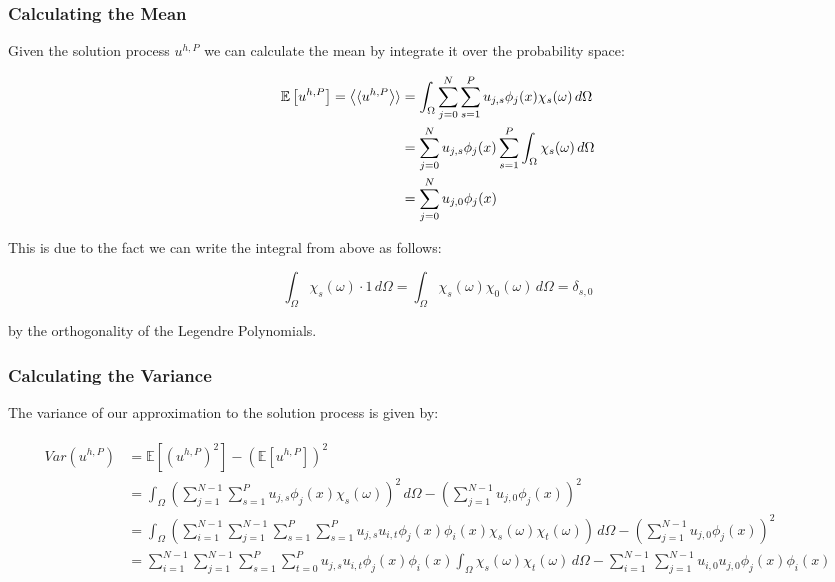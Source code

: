 \subsubsection{Calculating the Mean}

Given the solution process $u^{h,P}$ we can calculate the mean by integrate it
over the probability space:

\begin{align}
  \begin{split}
    \mathbb{E}\left[u^{h,P}\right] = \left\langle\langle u^{h,P}\right\rangle\rangle &=
    \int_\Omega\sum_{j=0}^N\sum_{s=1}^Pu_{j,s}\phi_j(x)\chi_s(\omega)\, d\Omega \\
    &= \sum_{j=0}^Nu_{j,s}\phi_j(x)\sum_{s=1}^P\int_\Omega\chi_s(\omega)\, d\Omega \\
    &= \sum_{j=0}^Nu_{j,0}\phi_j(x)
  \end{split}
\end{align}

This is due to the fact we can write the integral from above as follows:

\begin{equation}
    \int_\Omega\chi_s(\omega)\cdot 1\, d\Omega =
    \int_\Omega\chi_s(\omega)\chi_0(\omega)\, d\Omega = \delta_{s,0}
\end{equation}

by the orthogonality of the Legendre Polynomials.

\subsubsection{Calculating the Variance}

The variance of our approximation to the solution process is given by:

\begin{align}
  \begin{split}
    Var(u^{h,P}) &= \mathbb{E}\left[\left(u^{h,P}\right)^2\right]
                    - \left(\mathbb{E}\left[u^{h,P}\right]\right)^2 \\
      &= \int_\Omega\left(\sum_{j=1}^{N - 1}\sum_{s=1}^Pu_{j,s}\phi_j(x)\chi_s(\omega)\right)^2\, d\Omega
        - \left(\sum_{j=1}^{N - 1}u_{j,0}\phi_j(x)\right)^2 \\
      &= \int_\Omega\left(\sum_{i=1}^{N - 1}\sum_{j=1}^{N - 1}\sum_{s=1}^P\sum_{s=1}^P
           u_{j,s}u_{i,t}\phi_j(x)\phi_i(x)\chi_s(\omega)\chi_t(\omega)
         \right)\, d\Omega - \left(\sum_{j=1}^{N - 1}u_{j,0}\phi_j(x)\right)^2 \\
      &= \sum_{i=1}^{N - 1}\sum_{j=1}^{N - 1}\sum_{s=1}^P\sum_{t=0}^Pu_{j,s}u_{i,t}
            \phi_j(x)\phi_i(x)\int_\Omega\chi_s(\omega)\chi_t(\omega)\, d\Omega
            - \sum_{i=1}^{N - 1}\sum_{j=1}^{N - 1}u_{i,0}u_{j,0}\phi_j(x)\phi_i(x)
  \end{split}
\end{align}

